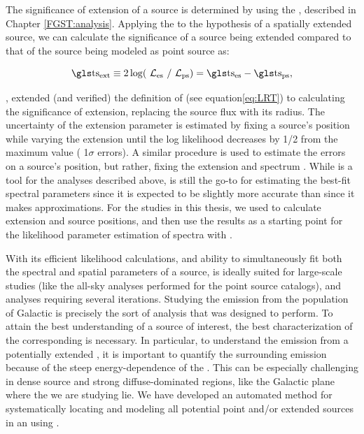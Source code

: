 The significance of extension of a source is determined by using the \lrt{}, described in Chapter \ref{FGST:analysis}. Applying the \lrt{} to the hypothesis of a spatially extended source, we can calculate the significance of a source being extended compared to that of the source being modeled as point source as:

\begin{equation}\label{eq:tsext}
\rm \ts{}_{ext} \equiv 2\log(\like_{\rm es}~/ \like_{\rm ps}) = \ts{}_{es} - \ts{}_{ps},
\end{equation}


\cite{Lande12}, extended (and verified) the definition of \ts{} (see equation\ref{eq:LRT}) to calculating the significance of extension, replacing the source flux with its radius. The uncertainty of the extension parameter is estimated by fixing a source's position while varying the extension until the log likelihood decreases by 1/2 from the maximum value (\ie{}  1$\sigma$ errors).   A similar procedure is used to estimate the errors on a source's position, but rather,  fixing the extension and spectrum \citep{2FGL}. While \ptlike{} is a tool for the analyses described above, \gtlike{} is still the go-to for estimating the best-fit spectral parameters since it is expected to be slightly more accurate than \ptlike{} since it makes approximations. For the studies in this thesis, we used \ptlike{} to calculate extension and source positions, and then use the \ptlike{} results as a starting point for the likelihood parameter estimation of spectra with \gtlike{}.

With its efficient likelihood calculations, and ability to simultaneously fit both the spectral and spatial parameters of a source, \ptlike{} is ideally suited for large-scale studies (like the all-sky analyses performed for the \lat{} point source catalogs), and analyses requiring several iterations. Studying the \gam{} emission from the population of Galactic \snrs{} is precisely the sort of analysis that \ptlike{} was designed to perform. To attain the best understanding of a source of interest, the best characterization of the corresponding \roi{} is necessary. In particular, to understand the \gev{} emission from a potentially extended \snr{}, it is important to quantify the surrounding emission because of the steep energy-dependence of the \lat{} \psf{}. This can be especially challenging in dense source and strong diffuse-dominated regions, like the Galactic plane where the \snrs{} we are studying lie. We have developed an automated method for systematically locating and modeling all potential point and/or extended sources in an \roi{} using \ptlike{}. 

